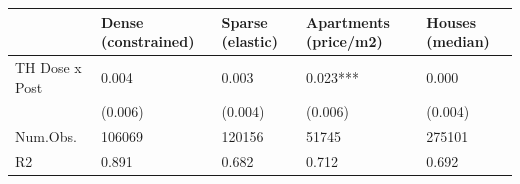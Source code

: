 \begin{tabular}{lllll}
\hline
& Dense
(constrained) & Sparse
(elastic) & Apartments
(price/m2) & Houses
(median) \\ \hline
TH Dose x Post & 0.004 & 0.003 & 0.023*** & 0.000 \\
& (0.006) & (0.004) & (0.006) & (0.004) \\
Num.Obs. & 106069 & 120156 & 51745 & 275101 \\
R2 & 0.891 & 0.682 & 0.712 & 0.692 \\
\hline
\end{tabular}
